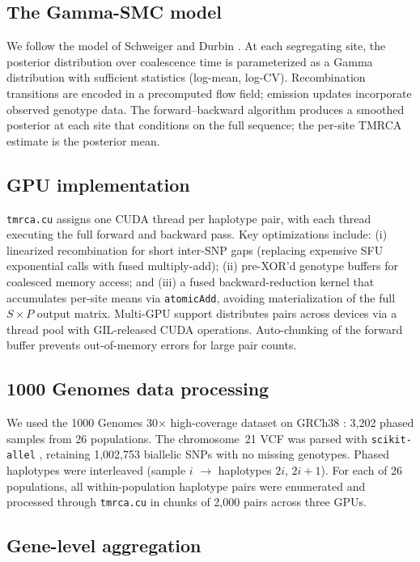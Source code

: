 \documentclass[10pt,letterpaper]{article}
\begin{document}
\subsection*{The Gamma-SMC model}

We follow the model of Schweiger and Durbin \cite{Schweiger2023}.
At each segregating site, the posterior distribution over coalescence time is parameterized as a Gamma distribution with sufficient statistics (log-mean, log-CV).
Recombination transitions are encoded in a precomputed flow field; emission updates incorporate observed genotype data.
The forward--backward algorithm produces a smoothed posterior at each site that conditions on the full sequence; the per-site TMRCA estimate is the posterior mean.

\subsection*{GPU implementation}

\texttt{tmrca.cu} assigns one CUDA thread per haplotype pair, with each thread executing the full forward and backward pass.
Key optimizations include: (i) linearized recombination for short inter-SNP gaps (replacing expensive SFU exponential calls with fused multiply-add); (ii) pre-XOR'd genotype buffers for coalesced memory access; and (iii) a fused backward-reduction kernel that accumulates per-site means via \texttt{atomicAdd}, avoiding materialization of the full $S \times P$ output matrix.
Multi-GPU support distributes pairs across devices via a thread pool with GIL-released CUDA operations.
Auto-chunking of the forward buffer prevents out-of-memory errors for large pair counts.

\subsection*{1000 Genomes data processing}

We used the 1000 Genomes 30$\times$ high-coverage dataset on GRCh38 \cite{Byrska2022}: 3{,}202 phased samples from 26 populations.
The chromosome~21 VCF was parsed with \texttt{scikit-allel} \cite{Miles2024}, retaining 1{,}002{,}753 biallelic SNPs with no missing genotypes.
Phased haplotypes were interleaved (sample $i$ $\to$ haplotypes $2i$, $2i+1$).
For each of 26 populations, all within-population haplotype pairs were enumerated and processed through \texttt{tmrca.cu} in chunks of 2{,}000 pairs across three GPUs.

\subsection*{Gene-level aggregation}
\end{document}
